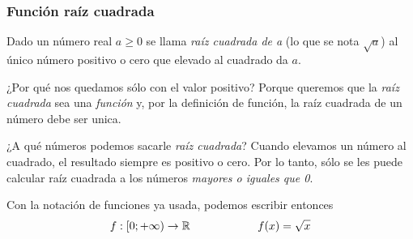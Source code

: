 \documentclass[../teoria.root.tex]{subfiles}
\begin{document}
\subsubsection{Función raíz cuadrada}
Dado un número real \(a\geq0\) se llama \textit{raíz cuadrada de a} (lo que se nota \(\sqrt{a}\)) al único número positivo o cero que elevado al cuadrado da \(a\).
\begin{center}
\end{center}
¿Por qué nos quedamos sólo con el valor positivo? Porque queremos que la \textit{raíz cuadrada} sea una \textit{función} y, por la definición de función, la raíz cuadrada de un número debe ser unica.

¿A qué números podemos sacarle \textit{raíz cuadrada}? Cuando elevamos un número al cuadrado, el resultado siempre es positivo o cero.
Por lo tanto, sólo se les puede calcular raíz cuadrada a los números \textit{mayores o iguales que 0}.

Con la notación de funciones ya usada, podemos escribir entonces
\[f:[0;+\infty)\rightarrow\mathbb{R} \qquad\qquad\qquad f(x)=\sqrt{x}\]
\end{document}
